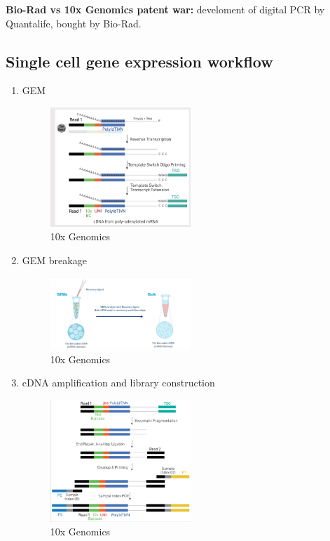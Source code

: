 \textbf{Bio-Rad vs 10x Genomics patent war:} develoment of digital PCR
by Quantalife, bought by Bio-Rad.

\hypertarget{single-cell-gene-expression-workflow}{%
\subsection{Single cell gene expression
workflow}\label{single-cell-gene-expression-workflow}}

\begin{enumerate}
\def\labelenumi{\arabic{enumi}.}
\item
  GEM

  \begin{figure}
  \centering
  \includegraphics[width=0.5\textwidth]{images/Screenshot_6.png}
  \caption{10x Genomics}
  \end{figure}
\item
  GEM breakage

  \begin{figure}
  \centering
  \includegraphics[width=0.5\textwidth]{images/Screenshot_7.png}
  \caption{10x Genomics}
  \end{figure}
\item
  cDNA amplification and library construction

  \begin{figure}
  \centering
  \includegraphics[width=0.5\textwidth]{images/Screenshot_8.png}
  \caption{10x Genomics}
  \end{figure}
\end{enumerate}

